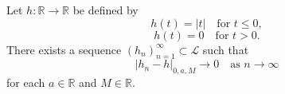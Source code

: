 Let $h: \mathbb{R} \to \mathbb{R}$ be defined by
$$h(t) = |t| \quad \text{for } t \leq 0,$$
$$h(t) = 0 \quad \text{for } t > 0.$$
There exists a sequence $(h_n)_{n=1}^{\infty} \subset \mathcal{L}$ such that
$$|h_n - h|_{0,a,M} \to 0 \quad \text{as } n \to \infty$$
for each $a \in \mathbb{R}$ and $M \in \mathbb{R}$.
